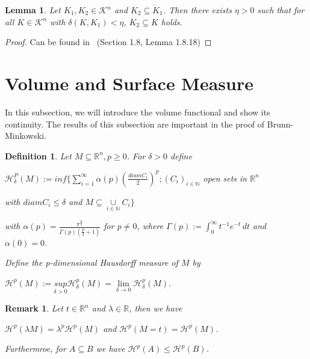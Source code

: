 \documentclass[a4paper]{book}
\newtheorem{lemma}[theorem]{Lemma}%
\newtheorem{remark}{Remark}%
\newtheorem{definition}{Definition}%
\begin{document}
\begin{lemma}
    Let $K_{1},K_{2}\in\mathscr{K}^{n}$ and $K_{2}\subseteq\mathring{K}_{1}$. Then there exists $\eta>0$ such that for all $K\in\mathscr{K}^{n}$ with $\delta(K,K_{1})<\eta$, $K_{2}\subseteq K$ holds.
\end{lemma}
\begin{proof}
    Can be found in~\cite{schneider2014convex} (Section 1.8, Lemma 1.8.18)
\end{proof}
    
\section{Volume and Surface Measure}
In this subsection, we will introduce the volume functional and show its continuity. The results of this subsection are important in the proof of Brunn-Minkowski.

\begin{definition}
	Let $M\subseteq\mathbb{R}^{n}, p\geq0$. For $\delta>0$ define
	\begin{center}
		$\mathscr{H}_{\delta}^{P}(M):=inf\{\sum\limits_{i=1}^{\infty}\alpha(p)(\frac{diam C_{i}}{2})^{p};(C_{i})_{i\in\mathbb{N}}$ open sets in $\mathbb{R}^n$

		\hspace{1cm}with $diam C_{i}\leq\delta$ and $M\subseteq\underset{i\in\mathbb{N}}{\cup}{C_{i}}\}$
	\end{center}
	with $\alpha(p)=\frac{\pi^{\frac{p}{2}}}{\Gamma(p)(\frac{p}{2}+1)}$ for $p\neq0$, where $\Gamma(p):=\int_{0}^{\infty}t^{-1}e^{-t}\,dt$ and $\alpha(0)=0$.
	
	Define the p-dimensional Hausdorff measure of $M$ by
	\begin{center}
		$\mathscr{H}^{p}(M):=\underset{\delta>0}{sup}\mathscr{H}_{\delta}^{p}(M)=\underset{\delta\to0}{\lim}\mathscr{H}_{\delta}^{p}(M)$.
	\end{center}
\end{definition}

\begin{remark}
	Let $t\in\mathbb{R}^{n}$ and $\lambda\in\mathbb{R}$, then we have
	\begin{center}
		$\mathscr{H}^{p}(\lambda M)=\lambda^{p}\mathscr{H}^{p}(M)$ and $\mathscr{H}^{p}(M=t)=\mathscr{H}^{p}(M)$.
	\end{center}
	Furthermroe, for $A\subseteq B$ we have $\mathscr{H}^{p}(A)\leq\mathscr{H}^{p}(B)$.
\end{remark}
\end{document}
